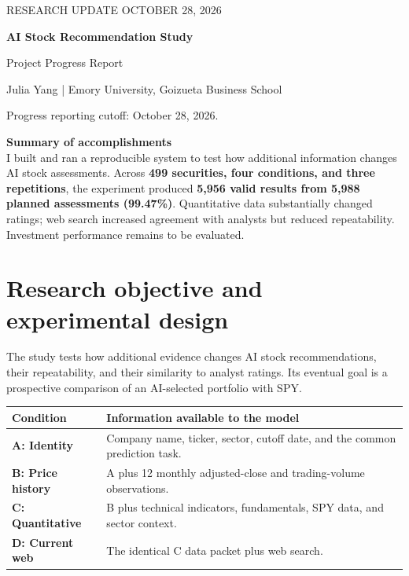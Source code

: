 \documentclass[10pt,letterpaper]{article}
\begin{document}
\thispagestyle{plain}
{\color{teal}\small RESEARCH UPDATE \hfill OCTOBER 28, 2026}\par
\vspace{3pt}
{\color{navy}\LARGE\bfseries AI Stock Recommendation Study}\par
{\large Project Progress Report}\par
{\small\color{muted}Julia Yang \;|\; Emory University, Goizueta Business School}\par
{\small\color{muted}Progress reporting cutoff: October 28, 2026.}\par
\vspace{5pt}

\noindent\colorbox{pale}{\parbox{\dimexpr\linewidth-2\fboxsep\relax}{%
\textbf{Summary of accomplishments}\\[3pt]
I built and ran a reproducible system to test how additional information changes AI stock assessments. Across \textbf{499 securities, four conditions, and three repetitions}, the experiment produced \textbf{5,956 valid results from 5,988 planned assessments (99.47\%)}. Quantitative data substantially changed ratings; web search increased agreement with analysts but reduced repeatability. Investment performance remains to be evaluated.}}

\section{Research objective and experimental design}
The study tests how additional evidence changes AI stock recommendations, their repeatability, and their similarity to analyst ratings. Its eventual goal is a prospective comparison of an AI-selected portfolio with SPY.

\begin{tabularx}{\linewidth}{@{}>{\bfseries}p{1.14in}Y@{}}
\toprule
{} Condition & Information available to the model \\
\midrule
A: Identity & Company name, ticker, sector, cutoff date, and the common prediction task. \\
B: Price history & A plus 12 monthly adjusted-close and trading-volume observations. \\
C: Quantitative & B plus technical indicators, fundamentals, SPY data, and sector context. \\
D: Current web & The identical C data packet plus web search. \\
\bottomrule
\end{tabularx}
\end{document}

